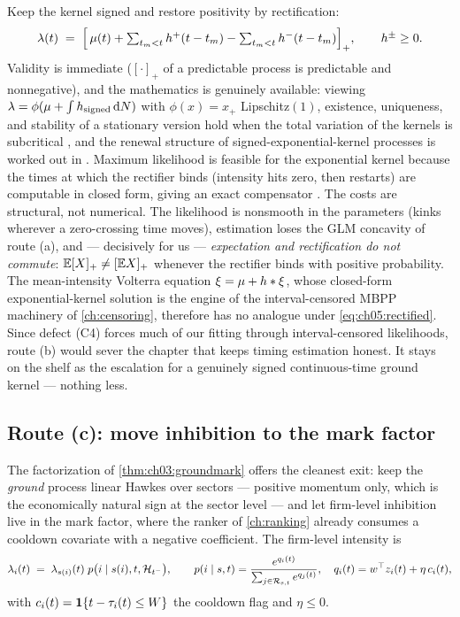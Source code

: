 Keep the kernel signed and restore positivity by rectification:
\begin{equation}\label{eq:ch05:rectified}
\lambda(t) \;=\; \Big[\, \mu(t)
+ \textstyle\sum_{t_m<t} h^{+}(t-t_m)
- \sum_{t_m<t} h^{-}(t-t_m) \Big]_{+},
\qquad h^{\pm} \ge 0 .
\end{equation}
Validity is immediate ($[\cdot]_+$ of a predictable process is
predictable and nonnegative), and the mathematics is genuinely available:
viewing $\lambda = \phi(\mu + \int h_{\mathrm{signed}} \,\mathrm{d} N)$ with
$\phi(x)=x_+$ Lipschitz$(1)$, existence, uniqueness, and stability of a
stationary version hold when the total variation of the kernels is
subcritical \citep{bremaud1996}, and the renewal structure of
signed-exponential-kernel processes is worked out in
\citet{costa2020}. Maximum likelihood is feasible for the exponential
kernel because the times at which the rectifier binds (intensity hits
zero, then restarts) are computable in closed form, giving an exact
compensator \citep{bonnet2021}. The costs are structural, not numerical.
The likelihood is nonsmooth in the parameters (kinks wherever a
zero-crossing time moves), estimation loses the GLM concavity of route
(a), and --- decisively for us --- \emph{expectation and rectification do
not commute}: $\mathbb{E}[X]_+ \ne [\mathbb{E} X]_+$ whenever the rectifier binds with
positive probability. The mean-intensity Volterra equation $\xi = \mu +
h * \xi$, whose closed-form exponential-kernel solution is the
engine of the interval-censored MBPP machinery of \cref{ch:censoring},
therefore has no analogue under \cref{eq:ch05:rectified}. Since defect
(C4) forces much of our fitting through interval-censored likelihoods,
route (b) would sever the chapter that keeps timing estimation honest.
It stays on the shelf as the escalation for a genuinely signed
continuous-time ground kernel --- nothing less.

\subsection*{Route (c): move inhibition to the mark factor}

The factorization of \cref{thm:ch03:groundmark} offers the cleanest exit:
keep the \emph{ground} process linear Hawkes over sectors --- positive
momentum only, which is the economically natural sign at the sector level
--- and let firm-level inhibition live in the mark factor, where the
ranker of \cref{ch:ranking} already consumes a cooldown covariate with a
negative coefficient. The firm-level intensity is
\begin{equation}\label{eq:ch05:markfactor}
\lambda_i(t) \;=\; \lambda_{s(i)}(t)\; p\big(i \mid s(i), t, \mathcal{H}_{t^-}\big),
\qquad
p(i \mid s, t) = \frac{e^{q_i(t)}}{\sum_{j \in \mathcal{R}_{s,t}}
e^{q_j(t)}},
\quad
q_i(t) = w^\top z_i(t) + \eta\, c_i(t),
\end{equation}
with $c_i(t) = \mathbf{1}\{t - \tau_i(t) \le W\}$ the cooldown flag and $\eta \le
0$.

